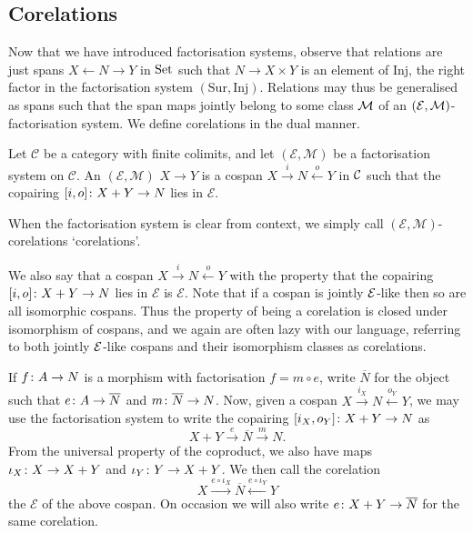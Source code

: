 \subsection{Corelations}
Now that we have introduced factorisation systems, observe that relations are
just spans $X \leftarrow N \to Y$ in $\mathrm{Set}$ such that $N \to X \times Y$ is an
element of $\mathrm{Inj}$, the right factor in the factorisation system
$(\mathrm{Sur},\mathrm{Inj})$. Relations may thus be generalised as spans such
that the span maps jointly belong to some class $\mathcal M$ of an $(\mathcal E,\mathcal
M)$-factorisation system. We define corelations in the dual manner.

\begin{definition}
  Let $\mathcal C$ be a category with finite colimits, and let $(\mathcal E,
  \mathcal M)$ be a factorisation system on $\mathcal C$. An $(\mathcal
  E,\mathcal M)$ $X \to Y$ is a cospan $X
  \stackrel{i}\longrightarrow N \stackrel{o}\longleftarrow Y$ in $\mathcal C$ such
  that the copairing $[i,o]{\colon} X+Y \to N$ lies in $\mathcal E$.
\end{definition}

When the factorisation system is clear from context, we simply call $(\mathcal
E,\mathcal M)$-corelations `corelations'.

We also say that a cospan $X \stackrel{i}\longrightarrow N
\stackrel{o}\longleftarrow Y$ with the property that the copairing $[i,o]{\colon}
X+Y \to N$ lies in $\mathcal E$ is  $\mathcal E$.
Note that if a cospan is jointly $\mathcal E$-like then so are all isomorphic
cospans. Thus the property of being a corelation is closed under isomorphism of
cospans, and we again are often lazy with our language, referring to both
jointly $\mathcal E$-like cospans and their isomorphism classes as corelations. 

If $f{\colon} A \to N$ is a morphism with factorisation $f = m \circ e$, write
$\overline N$ for the object such that $e{\colon} A \to \overline N$ and $m{\colon}
\overline N \to N$. Now, given a cospan $X \stackrel{i_X}{\longrightarrow} N
\stackrel{o_Y}{\longleftarrow} Y$, we may use the factorisation system to write
the copairing $[i_X,o_Y]{\colon} X+Y \to N$ as
\[
  X+Y \stackrel{e}{\longrightarrow} \overline{N} \stackrel{m}{\longrightarrow}
  N.
\]
From the universal property of the coproduct, we also have maps $\iota_X{\colon} X
\to X+Y$ and $\iota_Y{\colon} Y \to X+Y$. We then call the corelation 
\[
  X \stackrel{e\circ \iota_X}{\longrightarrow} \overline{N} \stackrel{e \circ
  \iota_Y}{\longleftarrow} Y
\]
the $\mathcal E$ of the above cospan. On occasion we will also
write $e{\colon} X+Y \to \overline N$ for the same corelation.

